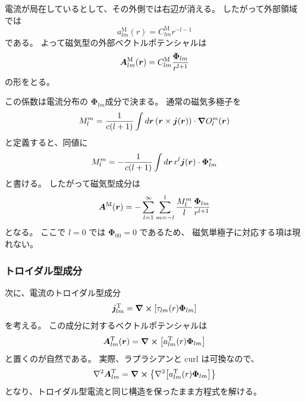 \documentclass[../master.tex]{subfiles}
\begin{document}
電流が局在しているとして、その外側では右辺が消える。
したがって外部領域では
\begin{equation}
    a_{lm}^{\mathrm{M}}(r)
    =
    C_{lm}^{\mathrm{M}}r^{-l-1}
\end{equation}
である。
よって磁気型の外部ベクトルポテンシャルは
\begin{equation}
    \vb*{A}^{\mathrm{M}}_{lm}(\vb*{r})
    =
    C_{lm}^{\mathrm{M}}
    \frac{\boldsymbol{\Phi}_{lm}}{r^{l+1}}
\end{equation}
の形をとる。

この係数は電流分布の
\(\boldsymbol{\Phi}_{lm}\)成分で決まる。
通常の磁気多極子を
\begin{equation}
    {
    M_l^m
    =
    \frac{1}{c(l+1)}
    \int d\vb*{r}\,
    \qty(\vb*{r}\times\vb*{j}(\vb*{r}))
    \cdot
    \grad O_l^m(\vb*{r})
    }
\end{equation}
と定義すると、同値に
\begin{equation}
    M_l^m
    =
    -\frac{1}{c(l+1)}
    \int d\vb*{r}\,
    r^l\vb*{j}(\vb*{r})
    \cdot
    \boldsymbol{\Phi}_{lm}^{*}
\end{equation}
と書ける。
したがって磁気型成分は
\begin{equation}
    {
    \vb*{A}^{\mathrm{M}}(\vb*{r})
    =
    -\sum_{l=1}^{\infty}\sum_{m=-l}^{l}
    \frac{M_l^m}{l}
    \frac{\boldsymbol{\Phi}_{lm}}{r^{l+1}}
    }
\end{equation}
となる。
ここで \(l=0\) では
\(\boldsymbol{\Phi}_{00}=0\) であるため、
磁気単極子に対応する項は現れない。

\subsubsection*{トロイダル型成分}

次に、電流のトロイダル型成分
\begin{equation}
    \vb*{j}^{\mathrm{T}}_{lm}
    =
    \curl\qty[
    \tau_{lm}(r)\boldsymbol{\Phi}_{lm}
    ]
\end{equation}
を考える。
この成分に対するベクトルポテンシャルは
\begin{equation}
    \vb*{A}^{\mathrm{T}}_{lm}(\vb*{r})
    =
    \curl\qty[
    a_{lm}^{\mathrm{T}}(r)
    \boldsymbol{\Phi}_{lm}
    ]
\end{equation}
と置くのが自然である。
実際、ラプラシアンと curl は可換なので、
\begin{equation}
    \laplacian\vb*{A}^{\mathrm{T}}_{lm}
    =
    \curl\qty{
    \laplacian
    \qty[
    a_{lm}^{\mathrm{T}}(r)
    \boldsymbol{\Phi}_{lm}
    ]
    }
\end{equation}
となり、トロイダル型電流と同じ構造を保ったまま方程式を解ける。
\end{document}
